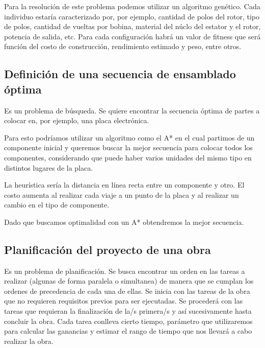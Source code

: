 \documentclass[
]{article}
\begin{document}
Para la resolución de este problema podemos utilizar un algoritmo
genético. Cada individuo estaría caracterizado por, por ejemplo,
cantidad de polos del rotor, tipo de polos, cantidad de vueltas por
bobina, material del núclo del estator y el rotor, potencia de salida,
etc. Para cada configuración habrá un valor de fitness que será función
del costo de construcción, rendimiento estimado y peso, entre otros.

\hypertarget{definiciuxf3n-de-una-secuencia-de-ensamblado-uxf3ptima}{%
\subsection{Definición de una secuencia de ensamblado
óptima}\label{definiciuxf3n-de-una-secuencia-de-ensamblado-uxf3ptima}}

Es un problema de búsqueda. Se quiere encontrar la secuencia óptima de
partes a colocar en, por ejemplo, una placa electrónica.

Para esto podríamos utilizar un algoritmo como el A* en el cual partimos
de un componente inicial y queremos buscar la mejor secuencia para
colocar todos los componentes, considerando que puede haber varios
unidades del mismo tipo en distintos lugares de la placa.

La heurística sería la distancia en línea recta entre un componente y
otro. El costo aumenta al realizar cada viaje a un punto de la placa y
al realizar un cambio en el tipo de componente.

Dado que buscamos optimalidad con un A* obtendremos la mejor secuencia.

\hypertarget{planificaciuxf3n-del-proyecto-de-una-obra}{%
\subsection{Planificación del proyecto de una
obra}\label{planificaciuxf3n-del-proyecto-de-una-obra}}

Es un problema de planificación. Se busca encontrar un orden en las
tareas a realizar (algunas de forma paralela o simultanea) de manera que
se cumplan los ordenes de precedencia de cada una de ellas. Se inicia
con las tareas de la obra que no requieren requisitos previos para ser
ejecutadas. Se procederá con las tareas que requieran la finalización de
la/s primera/s y así sucesivamente hasta concluir la obra. Cada tarea
conlleva cierto tiempo, parámetro que utilizaremos para calcular las
ganancias y estimar el rango de tiempo que nos llevará a cabo realizar
la obra.
\end{document}
